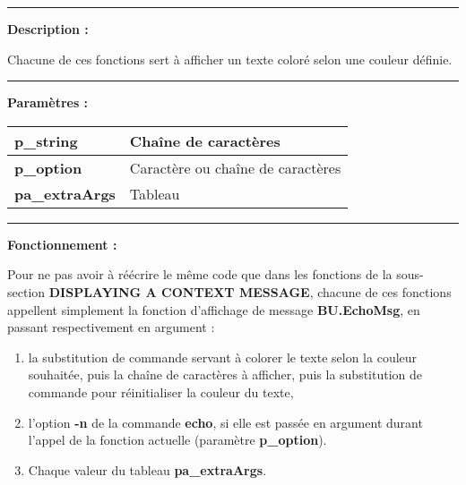 \documentclass[a4paper,10pt]{article}
\begin{document}

\par\noindent\rule{\textwidth}{0.4pt}

\begin{justify}
    \textbf{Description :}

    Chacune de ces fonctions sert à afficher un texte coloré selon une couleur définie.
\end{justify}


\par\noindent\rule{\textwidth}{0.4pt}

\begin{justify}
    \textbf{Paramètres :}

    \begin{tabular}{|l|l|}
        \hline
        \textbf{\color{vars}p\_string} & Chaîne de caractères\\
        \hline
        \textbf{\color{vars}p\_option} & Caractère ou chaîne de caractères\\
        \hline
        \textbf{\color{vars}pa\_extraArgs} & Tableau\\
        \hline
    \end{tabular}
\end{justify}


\par\noindent\rule{\textwidth}{0.4pt}

\begin{justify}
    \textbf{Fonctionnement :}

    Pour ne pas avoir à réécrire le même code que dans les fonctions de la sous-section \textbf{\color{sec2}DISPLAYING A CONTEXT MESSAGE}, chacune de ces fonctions appellent simplement la fonction d'affichage de message \textbf{\color{func}BU.EchoMsg}, en passant respectivement en argument :
    \begin{enumerate}
        \item la substitution de commande servant à colorer le texte selon la couleur souhaitée, puis la chaîne de caractères à afficher, puis la substitution de commande pour réinitialiser la couleur du texte,
        \item l'option \textbf{\color{cmds}-n} de la commande \textbf{\color{cmds}echo}, si elle est passée en argument durant l'appel de la fonction actuelle (paramètre \textbf{\color{vars}p\_option}).
        \item Chaque valeur du tableau \textbf{\color{vars}pa\_extraArgs}.
    \end{enumerate}
\end{justify}
\end{document}
